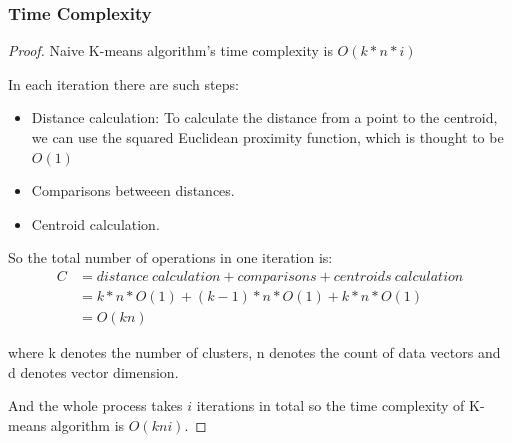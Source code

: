 \documentclass[11pt]{article}
\begin{document}
  \subsubsection{Time Complexity}
  \begin{proof}
    Naive K-means algorithm's time complexity is $O(k*n*i)$
    \par In each iteration there are such steps:
    \begin{itemize}
      \item Distance calculation: To calculate the distance from a point to the centroid, we can use the squared Euclidean proximity function, which is thought to be $O(1)$
      \item Comparisons betweeen distances.
      \item Centroid calculation.
    \end{itemize}
    \par So the total number of operations in one iteration is:
    \begin{equation*}
      \begin{split}
        C &=  distance\ calculation + comparisons + centroids\ calculation\\
        & = k * n * O(1) + (k-1) * n * O(1) + k * n * O(1) \\
        & = O(kn)
      \end{split}
    \end{equation*}
    \par where k denotes the number of clusters, n denotes the count of data vectors and d denotes vector dimension.
    \par And the whole process takes $i$ iterations in total so the time complexity of K-means algorithm is $O(kni)$.
    \end{proof}
\end{document}
